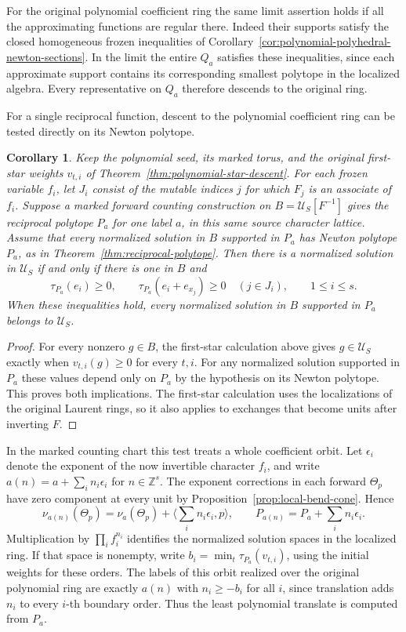 \documentclass[11pt,reqno]{amsart}
\numberwithin{equation}{section}
\newtheorem{corollary}[theorem]{Corollary}
\theoremstyle{definition}
\theoremstyle{remark}
\begin{document}
For the original polynomial coefficient ring the same limit
assertion holds if all the approximating functions are regular
there. Indeed their supports satisfy the closed homogeneous frozen
inequalities of Corollary~\ref{cor:polynomial-polyhedral-newton-sections}.
In the limit the entire \(Q_a\) satisfies these inequalities, since
each approximate support contains its corresponding smallest
polytope in the localized algebra. Every representative on \(Q_a\)
therefore descends to the original ring.

For a single reciprocal function, descent to the polynomial
coefficient ring can be tested directly on its Newton polytope.

\begin{corollary}\label{cor:polynomial-star-reciprocal}
Keep the polynomial seed, its marked torus, and the original first-star
weights \(v_{t,i}\) of Theorem~\ref{thm:polynomial-star-descent}.
For each frozen variable \(f_i\), let \(J_i\) consist of the mutable
indices \(j\) for which \(F_j\) is an associate of \(f_i\).
Suppose a marked forward counting construction on
\(B=\mathcal U_S[F^{-1}]\) gives the reciprocal polytope \(P_a\) for
one label \(a\), in this same source character lattice. Assume that
every normalized solution in \(B\) supported in \(P_a\) has Newton
polytope \(P_a\), as in Theorem~\ref{thm:reciprocal-polytope}.
Then there is a normalized solution in \(\mathcal U_S\) if and only if
there is one in \(B\) and
\[ \tau_{P_a}(e_i)\ge0,\qquad \tau_{P_a}(e_i+e_{x_j})\ge0\quad(j\in J_i),\qquad 1\le i\le s. \]
When these inequalities hold, every normalized solution in \(B\)
supported in \(P_a\) belongs to \(\mathcal U_S\).
\end{corollary}

\begin{proof}
For every nonzero \(g\in B\), the first-star calculation above gives
\(g\in\mathcal U_S\) exactly when \(v_{t,i}(g)\ge0\) for every
\(t,i\). For any normalized solution supported in \(P_a\) these
values depend only on \(P_a\) by the hypothesis on its Newton
polytope. This proves both implications. The first-star calculation
uses the localizations of the original Laurent rings, so it also
applies to exchanges that become units after inverting \(F\).
\end{proof}

In the marked counting chart this test treats a whole coefficient orbit.
Let \(\epsilon_i\) denote the exponent of the now invertible
character \(f_i\), and write \(a(n)=a+\sum_i n_i\epsilon_i\) for
\(n\in\mathbb Z^s\). The exponent corrections in each forward
\(\Theta_p\) have zero component at every unit by
Proposition~\ref{prop:local-bend-cone}. Hence
\[ \nu_{a(n)}(\Theta_p)=\nu_a(\Theta_p) +\Big\langle\sum_i n_i\epsilon_i,p\Big\rangle, \qquad P_{a(n)}=P_a+\sum_i n_i\epsilon_i . \]
Multiplication by \(\prod_i f_i^{n_i}\) identifies the normalized
solution spaces in the localized ring. If that space is nonempty,
write \(b_i=\min_t\tau_{P_a}(v_{t,i})\), using the initial weights for
these orders. The labels of this orbit realized over the original
polynomial ring are exactly \(a(n)\) with \(n_i\ge-b_i\) for all
\(i\), since translation adds \(n_i\) to every \(i\)-th boundary
order. Thus the least polynomial translate is computed from \(P_a\).
\end{document}
